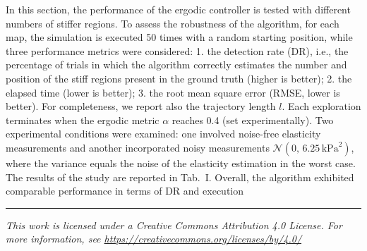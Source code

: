 \documentclass[11pt]{article}
\begin{document}
\noindent
In this section, the performance of the ergodic controller is tested
with different numbers of stiffer regions. To assess the robustness
of the algorithm, for each map, the simulation is executed 50 times
with a random starting position, while three performance metrics
were considered: 1. the detection rate (DR), i.e., the percentage of
trials in which the algorithm correctly estimates the number and
position of the stiff regions present in the ground truth (higher is
better); 2. the elapsed time (lower is better); 3. the root mean
square error (RMSE, lower is better). For completeness, we report
also the trajectory length $l$. Each exploration terminates when the
ergodic metric $\alpha$ reaches 0.4 (set experimentally). Two
experimental conditions were examined: one involved noise-free
elasticity measurements and another incorporated noisy measurements
$\mathcal{N}(0,\,6.25\,\mathrm{kPa}^{2})$, where the variance equals
the noise of the elasticity estimation in the worst case. The
results of the study are reported in Tab.~I. Overall, the algorithm
exhibited comparable performance in terms of DR and execution

\vfill
\hrule
\vspace{0.3em}
\begin{center}
{\footnotesize\itshape
This work is licensed under a Creative Commons Attribution 4.0
License. For more information, see
\url{https://creativecommons.org/licenses/by/4.0/}\par}
\end{center}
\end{document}
